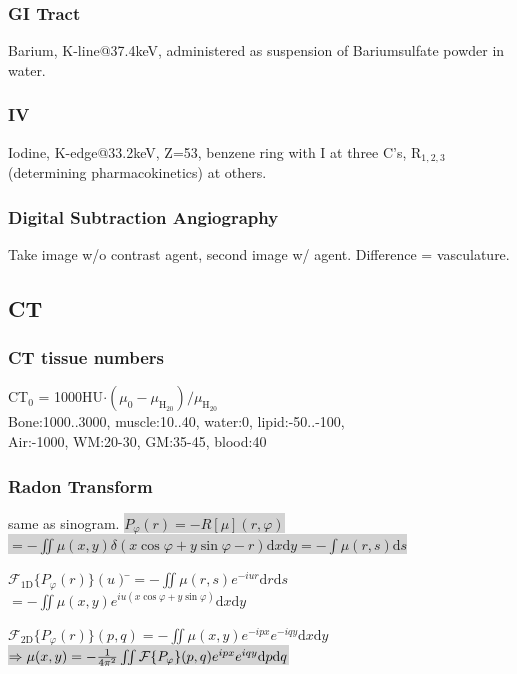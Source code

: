 \documentclass[9pt]{article}
\newcommand{\grey}[1]{\setlength{\fboxsep}{0pt}\colorbox{lightgrey}{#1}}
\newcommand{\dif}{\mathrm{d}}
\newcommand{\fcal}{\mathcal{F}}
\begin{document}
\begin{multicols}{2}
\subsubsection{GI Tract} 
Barium, K-line@37.4keV, administered as suspension of Bariumsulfate powder in water.

\subsubsection{IV}
Iodine, K-edge@33.2keV, Z=53, benzene ring with I at three C's, R${}_{1,2,3}$ (determining pharmacokinetics) at others.

\subsubsection{Digital Subtraction Angiography} Take image w/o contrast agent, second image w/ agent. Difference = vasculature.

\subsection{CT}
\subsubsection{CT tissue numbers} 
CT${}_0$ = 1000HU$\cdot (\mu_0-\mu_\mathrm{H_20}) /\mu_\mathrm{H_20}$ \\
Bone:1000..3000, muscle:10..40, water:0, lipid:-50..-100, \\ Air:-1000, WM:20-30, GM:35-45, blood:40

\subsubsection{Radon Transform} same as sinogram.
\grey{$P_\varphi(r) = -R[\mu](r,\varphi)$}\\
\grey{$ = -\iint \mu(x,y) \delta(x\cos\varphi + y\sin\varphi - r)\dif x\dif y = -\int\mu(r,s)\dif s$}
\begin{tabbing}
$\fcal_\mathrm{1D}\{P_\varphi(r)\}(u) \: $\=$= -\iint \mu(r,s)e^{-iur}\dif r\dif s$ \\ 
\> $= -\iint \mu(x,y)e^{iu(x\cos\varphi + y\sin\varphi)}\dif x\dif y$
\end{tabbing}
$\fcal_\mathrm{2D}\{P_\varphi(r)\}(p,q) = -\iint \mu(x,y)e^{-ipx}e^{-iqy}\dif x\dif y$ \\
\grey{$\Rightarrow \mu(x,y) = - {1 \over 4\pi^2} \iint \fcal\{P_\varphi\}(p,q)e^{ipx}e^{iqy}\dif p\dif q$}


\end{multicols}
\end{document}
